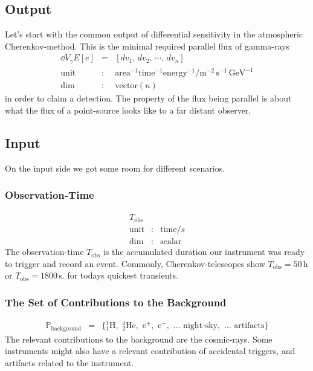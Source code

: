 \documentclass{article}%
\begin{document}
\subsection{Output}
%
Let's start with the common output of differential sensitivity in the atmospheric Cherenkov-method.
%
This is the minimal required parallel flux of gamma-rays
%
\begin{eqnarray*}
\dd{V_\gamma}{E}[e] &=& [dv_1, \, dv_2, \, \cdots, \, dv_n]\\
\text{unit} &:& \text{area}^{-1} \text{time}^{-1} \text{energy}^{-1} / \text{m}^{-2}\,\text{s}^{-1}\,\text{GeV}^{-1}\\
\text{dim} &:& \text{vector}(n)
\end{eqnarray*}
%
in order to claim a detection.
%
The property of the flux being parallel is about what the flux of a point-source looks like to a far distant observer.
%
\subsection{Input}
%
On the input side we got some room for different scenarios.
%
\subsubsection*{Observation-Time}
%
\begin{eqnarray*}
T_\text{obs} && \\
\text{unit} &:& \text{time} / s\\
\text{dim} &:& \text{scalar}
\end{eqnarray*}
%
The observation-time $T_\text{obs}$ is the accumulated duration our instrument was ready to trigger and record an event.
%
Commonly, Cherenkov-telescopes show $T_\text{obs} = 50\,$h or $T_\text{obs} = 1800\,$s. for todays quickest transients.
%
\subsubsection*{The Set of Contributions to the Background}
%
\begin{eqnarray*}
\mathbb{P}_\text{background} &=& \{
{_1^1}\text{H},\,\,
{_2^4}\text{He},\,\,
\text{e}^{+},\,\,
\text{e}^{-},\,\,
\dots{}\,\,
\text{night-sky},\,\,
\dots{}\,\,
\text{artifacts}
\}
\end{eqnarray*}
%
The relevant contributions to the background are the cosmic-rays. Some instruments might also have a relevant contribution of accidental triggers, and artifacts related to the instrument.
%
\end{document}
